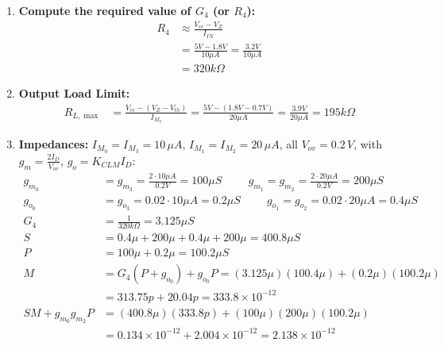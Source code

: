 \begin{enumerate}
\begin{align*}
      W_1 &= 2 \cdot W_0 = 2 \cdot 5 \mu m = 10 \mu m \\
      W_2 &= 2 \cdot W_3 = 2 \cdot 5 \mu m = 10 \mu m
    \end{align*}
    Check: \(M_2\) at \(I_{OUT} = 2 \cdot 10 \mu A = 20 \mu A\) has
    \(V_{ov_2} = \sqrt{\frac{2 \cdot 20 \mu A \cdot 1 \mu m}{100 \mu A/V^2 \cdot 10 \mu m}} = \sqrt{0.04 V^2} = 0.2V\), as chosen.
  \item \textbf{Compute the required value of $G_4$ (or $R_4$):}
    \begin{align*}
      R_4 &\approx \frac{V_{cc} - V_{Z}}{I_{IN}} \\
          &= \frac{5 V - 1.8 V}{10 \mu A} = \frac{3.2 V}{10 \mu A} \\
          &= 320 k\Omega
    \end{align*}
  \item \textbf{Output Load Limit:}
    \begin{align*}
      R_{L, \max} &= \frac{V_{cc} - (V_Z - V_{th})}{I_{M_2}} = \frac{5 V - (1.8 V - 0.7 V)}{20 \mu A} = \frac{3.9 V}{20 \mu A} = 195 k\Omega
    \end{align*}
  \item \textbf{Impedances:} \(I_{M_0} = I_{M_3} = 10\,\mu A\),
    \(I_{M_1} = I_{M_2} = 20\,\mu A\), all \(V_{ov} = 0.2\,V\), with
    \(g_m = \frac{2 I_D}{V_{ov}}\), \(g_o = K_{CLM} I_D\):
    \begin{align*}
      g_{m_0} &= g_{m_3} = \frac{2 \cdot 10 \mu A}{0.2 V} = 100 \mu S \hspace{1cm} g_{m_1} = g_{m_2} = \frac{2 \cdot 20 \mu A}{0.2 V} = 200 \mu S \\
      g_{o_0} &= g_{o_3} = 0.02 \cdot 10 \mu A = 0.2 \mu S \hspace{1cm} g_{o_1} = g_{o_2} = 0.02 \cdot 20 \mu A = 0.4 \mu S \\
      G_4 &= \frac{1}{320 k\Omega} = 3.125 \mu S \\
      S &= 0.4 \mu + 200 \mu + 0.4 \mu + 200 \mu = 400.8 \mu S \\
      P &= 100 \mu + 0.2 \mu = 100.2 \mu S \\
      M &= G_4 (P + g_{o_0}) + g_{o_0} P = (3.125 \mu)(100.4 \mu) + (0.2 \mu)(100.2 \mu) \\
        &= 313.75 p + 20.04 p = 333.8 \times 10^{-12} \\
      S M + g_{m_0} g_{m_2} P &= (400.8 \mu)(333.8 p) + (100 \mu)(200 \mu)(100.2 \mu) \\
                              &= 0.134 \times 10^{-12} + 2.004 \times 10^{-12} = 2.138 \times 10^{-12}
    \end{align*}

\end{enumerate}

